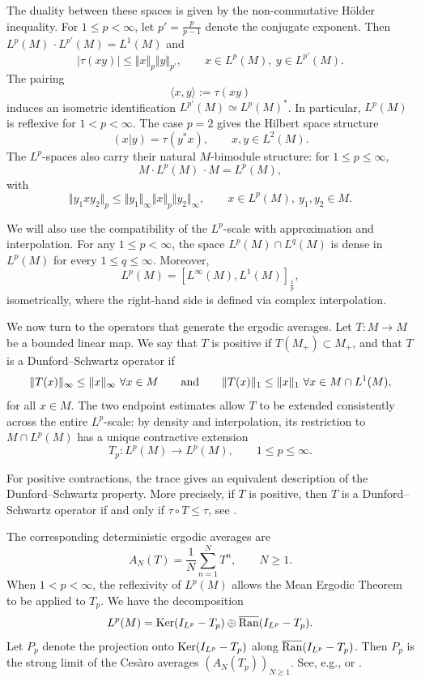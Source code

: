 \documentclass[12pt]{amsart}
\newcommand{\norm}[1]{\Vert#1\Vert}
\theoremstyle{remark}
\theoremstyle{definition}
\numberwithin{equation}{section}
\begin{document}
The duality between these spaces is given by the non-commutative
H\"older inequality. For $1\leq p<\infty$, let
$p'=\frac{p}{p-1}$ denote the conjugate exponent. Then
$L^p(M)\,\cdotp L^{p'}(M)=L^1(M)$ and
\begin{equation}\label{2H}
\vert\tau(xy)\vert\leq \norm{x}_p\norm{y}_{p'},
\qquad x\in L^p(M),\ y\in L^{p'}(M).
\end{equation}
The pairing
\[
\langle x,y\rangle:=\tau(xy)
\]
induces an isometric identification
$L^{p'}(M)\simeq L^p(M)^*$. In particular, $L^p(M)$ is reflexive for
$1<p<\infty$. The case $p=2$ gives the Hilbert space structure
$$
(x\vert y)=\tau(y^*x),\qquad x,y\in L^2(M).
$$
The $L^p$-spaces also carry their natural $M$-bimodule structure: for
$1\leq p\leq\infty$,
$$
M\cdotp L^p(M)\,\cdotp M=L^p(M),
$$
with
$$
\norm{y_1xy_2}_p
\leq\norm{y_1}_\infty\norm{x}_p\norm{y_2}_\infty,
\qquad x\in L^p(M),\ y_1,y_2\in M.
$$

We will also use the compatibility of the $L^p$-scale with
approximation and interpolation. For any $1\leq p<\infty$, the space
$L^p(M)\cap L^q(M)$ is dense in $L^p(M)$ for every
$1\leq q\leq\infty$. Moreover,
$$
L^p(M)=[L^\infty(M),L^1(M)]_{\frac{1}{p}},
$$
isometrically, where the right-hand side is defined via complex
interpolation.

We now turn to the operators that generate the ergodic averages.
Let $T\colon M\to M$ be a bounded linear map. We say that $T$ is positive
if $T(M_+)\subset M_+$, and that $T$ is a Dunford--Schwartz operator if
$$
\norm{T(x)}_\infty\leq \norm{x}_\infty\ 
\forall x\in M
\qquad \hbox{and}\qquad
\norm{T(x)}_1\leq \norm{x}_1\
\forall x\in M\cap L^1(M),
$$
for all $x\in M$. The two endpoint estimates allow $T$ to be extended
consistently across the entire $L^p$-scale: by density and interpolation,
its restriction to $M\cap L^p(M)$ has a unique contractive extension
$$
T_p\colon L^p(M)\longrightarrow L^p(M),
\qquad 1\leq p\leq\infty.
$$

For positive contractions, the trace gives an equivalent description of
the Dunford--Schwartz property. More precisely, if $T$ is positive, then
$T$ is a Dunford--Schwartz operator if and only if
$\tau\circ T\leq\tau$, see \cite[Lemma 1.1]{JX}.

The corresponding deterministic ergodic averages are
\begin{equation}\label{2Cesaro}
A_N(T)=\frac1N\sum_{n=1}^N T^n,\qquad N\geq1.
\end{equation}
When $1<p<\infty$, the reflexivity of $L^p(M)$ allows the Mean Ergodic
Theorem to be applied to $T_p$. We have the decomposition
$$
L^p(M)= {\rm Ker}(I_{L^p} -T_p)\oplus
\overline{\rm Ran}(I_{L^p}-T_p).
$$
Let $P_p$ denote the projection onto
${\rm Ker}(I_{L^p} -T_p)$ along
$\overline{\rm Ran}(I_{L^p}-T_p)$. Then
$P_p$ is the strong limit of the Ces\`aro averages
$(A_N(T_p))_{N\geq1}$. See, e.g.,
\cite[Section 8.4]{EFHN} or \cite[Theorem 1.15]{LM}. 
\end{document}
